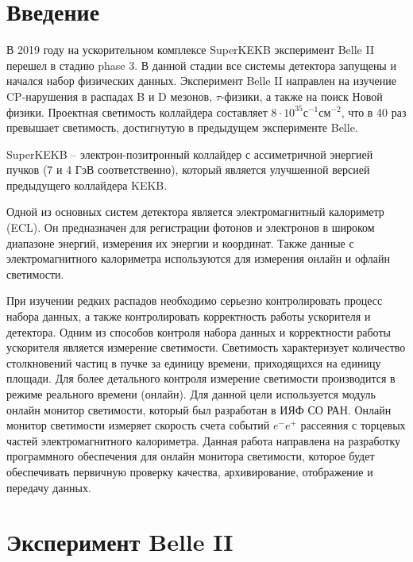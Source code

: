 \documentclass[a4paper, 14pt]{extarticle}
\let\stdsection\section
\renewcommand\section{\newpage\stdsection}
\begin{document}



\tableofcontents
\thispagestyle{empty}
\newpage

\setcounter{page}{3}
\section*{Введение}
  В 2019 году на ускорительном комплексе SuperKEKB эксперимент Belle II перешел в стадию phase 3. В данной стадии все системы детектора запущены и начался набор физических данных. Эксперимент Belle II направлен на изучение CP-нарушения в распадах B и D мезонов, $\tau$-физики, а также на поиск Новой физики. Проектная светимость коллайдера составляет $8\cdot10^{35}$с$^{-1}$см$^{-2}$, что в 40 раз превышает светимость, достигнутую в предыдущем эксперименте Belle.\par
  SuperKEKB -- электрон-позитронный коллайдер с ассиметричной энергией пучков (7 и 4 ГэВ соответственно), который является улучшенной версией предыдущего коллайдера KEKB.\par
  Одной из основных систем детектора является электромагнитный калориметр (ECL). Он предназначен для регистрации фотонов и электронов в широком диапазоне энергий, измерения их энергии и координат. Также данные с электромагнитного калориметра используются для измерения онлайн и офлайн светимости.\par
  При изучении редких распадов необходимо серьезно контролировать процесс набора данных, а также контролировать корректность работы ускорителя и детектора. Одним из способов контроля набора данных и корректности работы ускорителя является измерение светимости. Светимость характеризует количество столкновений частиц в пучке за единицу времени, приходящихся на единицу площади. Для более детального контроля измерение светимости производится в режиме реального времени (онлайн). Для данной цели используется модуль онлайн монитор светимости, который был разработан в ИЯФ СО РАН. Онлайн монитор светимости измеряет скорость счета событий $e^-e^+$ рассеяния с торцевых частей электромагнитного калориметра. Данная работа направлена на разработку программного обеспечения для онлайн монитора светимости, которое будет обеспечивать первичную проверку качества, архивирование, отображение и передачу данных.\par
\section{Эксперимент Belle II}
\end{document}
